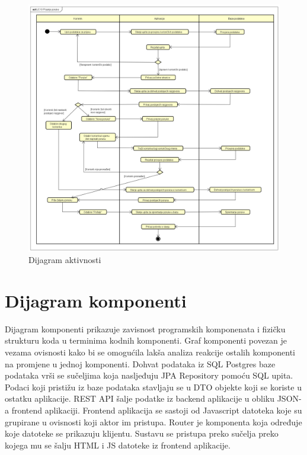 	\begin{figure}[H]
		\begin{center}
			\includegraphics[width=17cm]{slike/dijagram_aktivnosti.PNG}
		\end{center}
		\caption{Dijagram aktivnosti}
		\label{fig:dijakt}
	\end{figure}
	
	\eject
	
	
	
	\section{Dijagram komponenti}
	
	Dijagram komponenti prikazuje zavisnost programskih komponenata i fizičku strukturu koda u terminima kodnih komponenti. Graf komponenti povezan je vezama ovisnosti kako bi se omogućila lakša analiza reakcije ostalih komponenti na promjene u jednoj komponenti. Dohvat podataka iz SQL Postgres baze podataka vrši se sučeljima koja nasljeđuju JPA Repository pomoću SQL upita. Podaci koji pristižu iz baze podataka stavljaju se u DTO objekte koji se koriste u ostatku aplikacije. REST API šalje podatke iz backend aplikacije u obliku JSON-a frontend aplikaciji. Frontend aplikacija se sastoji od Javascript datoteka koje su grupirane u ovisnosti koji aktor im pristupa. Router je komponenta koja određuje koje datoteke se prikazuju klijentu. Sustavu se pristupa preko sučelja preko kojega mu se šalju HTML i JS datoteke iz frontend aplikacije.
	
